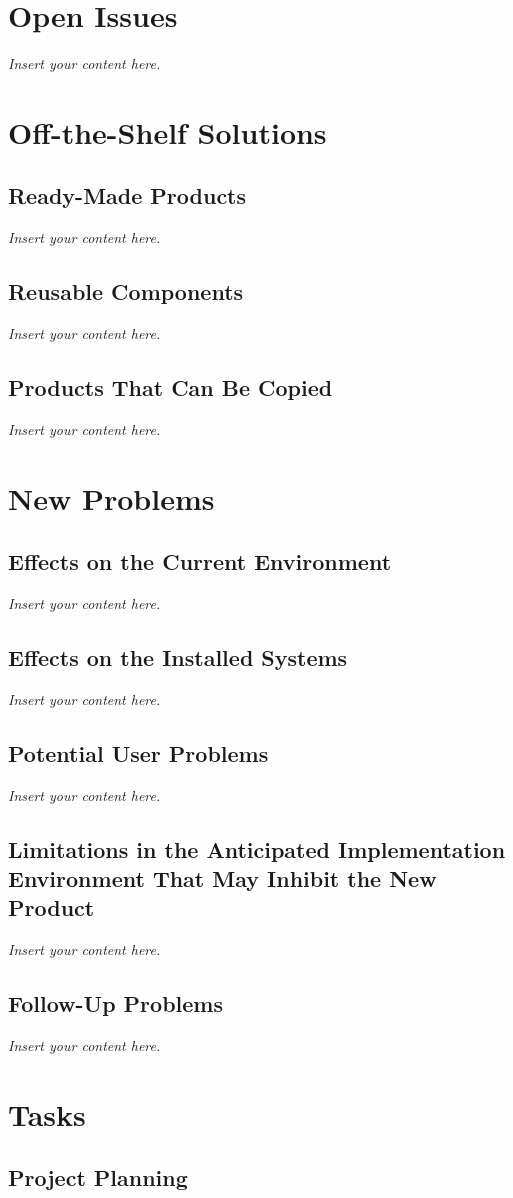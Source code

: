 \documentclass[12pt]{article}
\newcommand{\lips}{\textit{Insert your content here.}}
\begin{document}
\section{Open Issues}
\lips

\section{Off-the-Shelf Solutions}
\subsection{Ready-Made Products}
\lips
\subsection{Reusable Components}
\lips
\subsection{Products That Can Be Copied}
\lips

\section{New Problems}
\subsection{Effects on the Current Environment}
\lips
\subsection{Effects on the Installed Systems}
\lips
\subsection{Potential User Problems}
\lips
\subsection{Limitations in the Anticipated Implementation Environment That May
Inhibit the New Product}
\lips
\subsection{Follow-Up Problems}
\lips

\section{Tasks}
\subsection{Project Planning}
\end{document}
